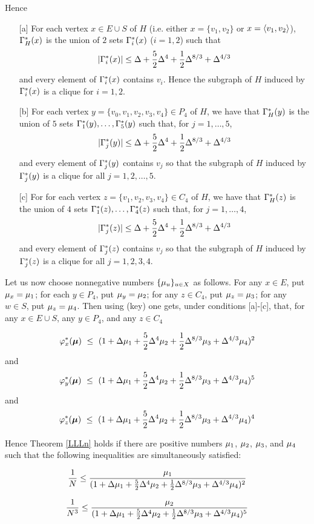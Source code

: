 \documentclass[11pt]{article}
\begin{document}
Hence

\begin{itemize}
\item[{[a]}]
For each  vertex $x\in E\cup S$ of $H$ (i.e. either $x=\{v_1,v_2\}$ or $x=\langle v_1,v_2\rangle$),
$\Gamma_H^*(x)$ is the union of $2$ sets $\Gamma_i^*(x)$ ($i=1,2$)
such that
$$
|\Gamma_i^*(x)|\le  \Delta + {5\over 2}\Delta^4+ {1\over 2}\Delta^{8/3}+\Delta^{4/3}
$$
and every element of $\Gamma_i^*(x)$ contains $v_i$.
Hence  the subgraph of $H$  induced by $\Gamma_i^*(x)$ is a clique for $i=1,2$.
\item[{[b]}]
For  each  vertex $y= \{v_0,v_1,v_2,v_3,v_4\}\in P_4$ of $H$, we have that
$\Gamma_H^*(y)$ is the union of $5$ sets $\Gamma_1^*(y),\dots,\Gamma_{5}^*(y)$ such that,
for $j=1,\dots,  5$,
$$
|\Gamma_j^*(y)|\le \Delta +{5\over 2}\Delta^4+ {1\over 2}\Delta^{8/3}+\Delta^{4/3}
$$
and every element of $\Gamma_{j}^*(y)$ contains $v_j$ so that the subgraph of $H$  induced by $\Gamma_j^*(y)$ is a clique
for all $j=1,2,\dots, 5$.
\item[{[c]}]
For  for each  vertex $z= \{v_1,v_2,v_3,v_4\}\in C_4$ of $H$, we have that
$\Gamma_H^*(z)$ is the union of $4$ sets $\Gamma_1^*(z),\dots,\Gamma_{4}^*(z)$ such that,
for $j=1,\dots,  4$,
$$
|\Gamma_j^*(z)|\le \Delta + {5\over 2}\Delta^4+ {1\over 2}\Delta^{8/3}+\Delta^{4/3}
$$
and every element of $\Gamma_{j}^*(z)$ contains $v_j$ so that the subgraph of $H$  induced by $\Gamma_j^*(z)$ is a clique
for all $j=1,2,3,4$.
\end{itemize}
Let us now choose nonnegative  numbers $\{\mu_u\}_{u\in X}$ as follows. For any $x\in E$, put $\mu_{x}=\mu_1$; for
each $y\in P_4$, put $\mu_y=\mu_2$; for any $z\in C_4$, put
$\mu_{z}=\mu_{3}$;  for any $w\in S$, put $\mu_{z}=\mu_{4}$.
Then using  \equ(key) one gets, under conditions [a]-[c], that, for any $x\in E\cup S$, any $y\in P_4$, and any $z\in C_4$


$$
\varphi^{*}_{x}(\bm \mu)~\le~(1+ \Delta\mu_1 + {5\over 2}\Delta^4\mu_2+ {1\over 2}\Delta^{8/3}\mu_3+\Delta^{4/3}\mu_4)^2
$$
and
$$
\varphi^{*}_{y}(\bm \mu)~\le~(1+ \Delta\mu_1 + {5\over 2}\Delta^4\mu_2+ {1\over 2}\Delta^{8/3}\mu_3+\Delta^{4/3}\mu_4)^5
$$
and
$$
\varphi^{*}_{z}(\bm \mu)~\le~(1+ \Delta\mu_1 + {5\over 2}\Delta^4\mu_2+ {1\over 2}\Delta^{8/3}\mu_3+\Delta^{4/3}\mu_4)^4
$$



Hence Theorem \ref{LLLn} holds if
there are positive numbers $\mu_1$, $\mu_2$, $\mu_3$, and $\mu_4$ such that
the following inequalities are simultaneously satisfied:

$$
{1\over N}\le {\mu_{1}\over (1+ \Delta\mu_1 + {5\over 2}\Delta^4\mu_2+ {1\over 2}\Delta^{8/3}\mu_3+\Delta^{4/3}\mu_4)^2}
$$

$$
{1\over N^3}\le {\mu_{2}\over (1+ \Delta\mu_1 + {5\over 2}\Delta^4\mu_2+ {1\over 2}\Delta^{8/3}\mu_3+\Delta^{4/3}\mu_4)^5}
$$
\end{document}
